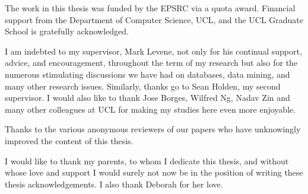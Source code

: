 
\begin{acknowledgements}

The work in this thesis was funded by the EPSRC via a quota award. 
Financial support from the Department of Computer Science, UCL, and
the UCL Graduate School is gratefully acknowledged.

\medskip

I am indebted to my supervisor, Mark Levene, not only for his
continual support, advice, and encouragement, throughout the term of
my research but also for the numerous stimulating discussions we have had
on databases, data mining, and many other research issues.  Similarly,
thanks go to Sean Holden, my second supervisor. I would also
like to thank Jose Borges, Wilfred Ng, Nadav Zin and many other
colleagues at UCL for making my studies here even more enjoyable.

\medskip

Thanks to the various anonymous reviewers of our papers who have
unknowingly improved the content of this thesis.

\medskip

I would like to thank my parents,
to whom I dedicate this thesis, and without
whose love and support I would surely not now be in
the position of writing these thesis acknowledgements. I also thank
Deborah for her love.  

\end{acknowledgements}

